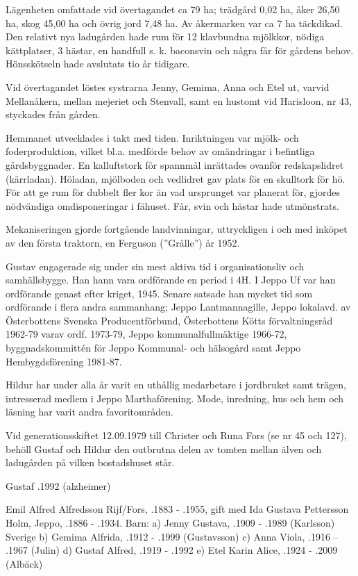 Lägenheten omfattade vid övertagandet ca 79 ha; trädgård 0,02 ha, åker 26,50 ha, skog 45,00 ha och övrig jord 7,48 ha. Av åkermarken var ca 7 ha täckdikad. Den relativt nya ladugården hade rum för 12 klavbundna mjölkkor, nödiga kättplatser, 3 hästar, en handfull s. k. baconsvin och några får för gårdens behov. Hönsskötseln hade avslutats tio år tidigare.

Vid övertagandet löstes systrarna Jenny, Gemima, Anna och Etel ut, varvid Mellanåkern, mellan mejeriet och Stenvall, samt en hustomt vid Harisloon, nr 43, styckades från gården.

Hemmanet utvecklades i takt med tiden. Inriktningen var mjölk- och foderproduktion, vilket bl.a. medförde behov av omändringar i befintliga gårdsbyggnader. En kalluftstork för spannmål inrättades ovanför redskapslidret (kärrladan). Höladan, mjölboden och vedlidret gav plats för en skulltork för hö. För att ge rum för dubbelt fler kor än vad ursprunget var planerat för, gjordes nödvändiga omdisponeringar i fähuset. Får, svin och hästar hade utmönstrats.

Mekaniseringen gjorde fortgående landvinningar, uttryckligen i och med inköpet av den första traktorn, en Ferguson (”Grålle”) år 1952.

Gustav engagerade sig under sin mest aktiva tid i organisationsliv och samhällsbygge. Han hann vara ordförande en period i 4H. I Jeppo Uf var han ordförande genast efter kriget, 1945. Senare satsade han mycket tid som ordförande i flera andra sammanhang; Jeppo Lantmannagille, Jeppo lokalavd. av Österbottens Svenska Producentförbund, Österbottens Kötts förvaltningsråd 1962-79 varav ordf. 1973-79, Jeppo kommunalfullmäktige 1966-72, byggnadskommittén för Jeppo Kommunal- och hälsogård samt Jeppo Hembygdsförening 1981-87.

Hildur har under alla år varit en uthållig medarbetare i jordbruket samt trägen, intresserad medlem i Jeppo Marthaförening. Mode, inredning, hus och hem och läsning har varit andra favoritområden.

Vid generationsskiftet 12.09.1979 till Christer och Runa Fors (se nr 45 och 127), behöll Gustaf och Hildur den outbrutna delen av tomten mellan älven och ladugården på vilken bostadshuset står.

Gustaf .1992 (alzheimer)



Emil Alfred Alfredsson Rijf/Fors, .1883 - .1955, gift med Ida Gustava Pettersson Holm, Jeppo, .1886 - .1934.
Barn:
a) Jenny Gustava, .1909 - .1989 (Karlsson) Sverige
b) Gemima Alfrida, .1912 - .1999 (Gustavsson)
c) Anna Viola, .1916 – .1967 (Julin)
d) Gustaf Alfred, .1919 - .1992
e) Etel Karin Alice, .1924 - .2009 (Albäck)

